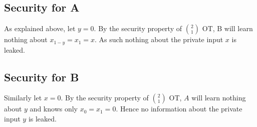 \documentclass[a4paper]{scrreprt}
\begin{document}
\subsection{Security for A}

As explained above, let $y = 0$. By the security property of $\binom{2}{1}$ OT,
B will learn nothing about $x_{1 - y} = x_1 = x$. As such nothing about the
private input $x$ is leaked.

\subsection{Security for B}

Similarly let $x = 0$. By the security property of $\binom{2}{1}$ OT, $A$ will
learn nothing about $y$ and knows only $x_0 = x_1 = 0$. Hence no information
about the private input $y$ is leaked.

\printbibliography
\end{document}
